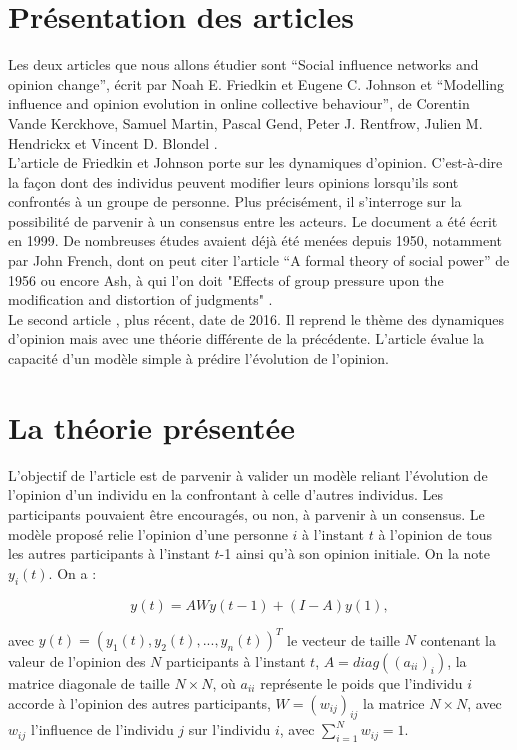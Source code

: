 \documentclass{scrreprt}
\begin{document}
\section{Présentation des articles}

Les deux articles que nous allons étudier sont “Social influence networks and opinion change”, écrit par Noah E. Friedkin et Eugene C. Johnson \cite{FJ} et “Modelling influence and opinion evolution in online collective behaviour”, de Corentin Vande Kerckhove, Samuel Martin, Pascal Gend, Peter J. Rentfrow, Julien M. Hendrickx et Vincent D. Blondel \cite{VMG}.\\

L’article \cite{FJ} de Friedkin et Johnson porte sur les dynamiques d’opinion. C’est-à-dire la façon dont des individus peuvent modifier leurs opinions lorsqu’ils sont confrontés à un groupe de personne. Plus précisément, il s’interroge sur la possibilité de parvenir à un consensus entre les acteurs. Le document a été écrit en 1999. De nombreuses études avaient déjà été menées depuis 1950, notamment par John French, dont on peut citer l'article ``A formal theory of social power'' \cite{French} de 1956 ou encore Ash, à qui l'on doit "Effects of group pressure upon the modification and distortion of judgments" \cite{Asch}.\\

Le second article \cite{VMG}, plus récent, date de 2016. Il reprend le thème des dynamiques d’opinion mais avec une théorie différente de la précédente. L'article évalue la capacité d'un modèle simple à prédire l'évolution de l'opinion.

\section{La théorie présentée}

L’objectif de l'article \cite{FJ} est de parvenir à valider un modèle reliant l’évolution de l’opinion d’un individu en la confrontant à celle d’autres individus. Les participants pouvaient être encouragés, ou non, à parvenir à un consensus. Le modèle proposé relie l’opinion d’une personne $i$ à l’instant $t$ à l’opinion de tous les autres participants à l’instant $t$-1 ainsi qu’à son opinion initiale. On la note $y_i(t)$. On a :

\begin{equation}
\label{1}
y(t) =AWy(t-1)+(I-A)y(1), 
\end{equation}

\noindent avec $y(t)=(y_1(t), y_2(t), ... , y_n(t))^T$ le vecteur de taille $N$ contenant la valeur de l’opinion des $N$ participants à l’instant $t$, $A=diag((a_{ii})_i)$, la matrice diagonale de taille $N\times N$, où $a_{ii}$ représente le poids que l'individu $i$ accorde à l'opinion des autres participants, $W=(w_{ij})_{ij}$ la matrice $N\times N$, avec $w_{ij}$ l’influence de l’individu $j$ sur l’individu $i$, avec $\sum_{i=1}^{N} w_{ij} = 1$. \\
\end{document}
